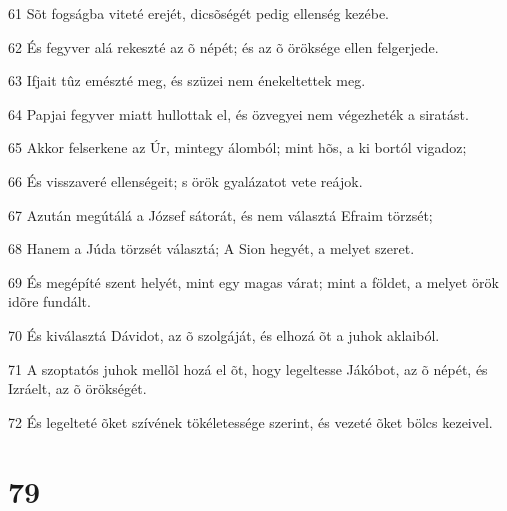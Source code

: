 \par 61 Sõt fogságba viteté erejét, dicsõségét pedig ellenség kezébe.
\par 62 És fegyver alá rekeszté az õ népét; és az õ öröksége ellen felgerjede.
\par 63 Ifjait tûz emészté meg, és szüzei nem énekeltettek meg.
\par 64 Papjai fegyver miatt hullottak el, és özvegyei nem végezheték a siratást.
\par 65 Akkor felserkene az Úr, mintegy álomból; mint hõs, a ki bortól vigadoz;
\par 66 És visszaveré ellenségeit; s örök gyalázatot vete reájok.
\par 67 Azután megútálá a József sátorát, és nem választá Efraim törzsét;
\par 68 Hanem a Júda törzsét választá; A Sion hegyét, a melyet szeret.
\par 69 És megépíté szent helyét, mint egy magas várat; mint a földet, a melyet örök idõre fundált.
\par 70 És kiválasztá Dávidot, az õ szolgáját, és elhozá õt a juhok aklaiból.
\par 71 A szoptatós juhok mellõl hozá el õt, hogy legeltesse Jákóbot, az õ népét, és Izráelt, az õ örökségét.
\par 72 És legelteté õket szívének tökéletessége szerint, és vezeté õket bölcs kezeivel.

\chapter{79}

